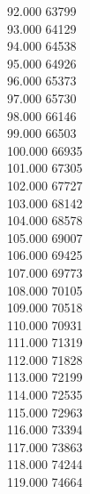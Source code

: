 { 92.000	63799 \\
 93.000	64129 \\
 94.000	64538 \\
 95.000	64926 \\
 96.000	65373 \\
 97.000	65730 \\
 98.000	66146 \\
 99.000	66503 \\
 100.000	66935 \\
 101.000	67305 \\
 102.000	67727 \\
 103.000	68142 \\
 104.000	68578 \\
 105.000	69007 \\
 106.000	69425 \\
 107.000	69773 \\
 108.000	70105 \\
 109.000	70518 \\
 110.000	70931 \\
 111.000	71319 \\
 112.000	71828 \\
 113.000	72199 \\
 114.000	72535 \\
 115.000	72963 \\
 116.000	73394 \\
 117.000	73863 \\
 118.000	74244 \\
 119.000	74664 \\
}
